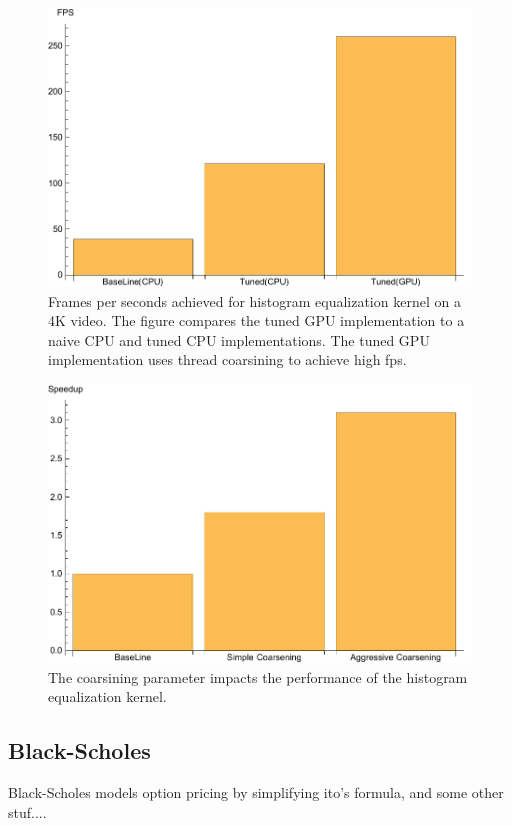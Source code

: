 \begin{figure}
\centering
\includegraphics[scale=0.5]{data/histogram.pdf}
\caption{Frames per seconds achieved for histogram equalization kernel on a 4K video. The figure compares the tuned GPU implementation to a naive CPU and tuned CPU implementations. The tuned GPU implementation uses thread coarsining to achieve high fps.}
\label{fig:histogram}
\centering
\end{figure}


\begin{figure}
\centering
\includegraphics[scale=0.5]{data/histogramc.pdf}
\caption{The coarsining parameter impacts the performance of the histogram equalization kernel.}
\label{fig:histogramCoarsining}
\centering
\end{figure}

\subsection{Black-Scholes}
Black-Scholes models option pricing by simplifying ito's formula, and some other stuf....




